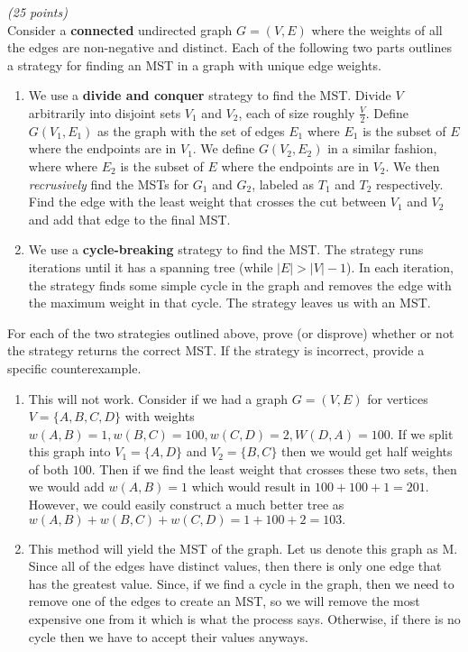 \documentclass{article}
\newcounter{ProblemCounter}
\newenvironment{problem}[1][Problem]{
 \begin{trivlist}
 \item[\hskip \labelsep {\bfseries #1}\hskip \labelsep {%
 \bfseries \theProblemCounter.%
 \stepcounter{ProblemCounter}%
 }]
}{
 \end{trivlist}
}
\begin{document}
\pagebreak
\begin{problem}\textit{(25 points)}\\
Consider a \textbf{connected} undirected graph $G=(V, E)$ where the weights of all the edges are non-negative and distinct. Each of the following two parts outlines a strategy for finding an MST in a graph with unique edge weights.

\begin{enumerate}
    \item We use a \textbf{divide and conquer} strategy to find the MST. Divide $V$ arbitrarily into disjoint sets $V_1$ and $V_2$, each of size roughly $\frac{V}{2}$. Define $G(V_1, E_1)$ as the graph with the set of edges $E_1$ where $E_1$ is the subset of $E$ where the endpoints are in $V_1$. We define $G(V_2, E_2)$ in a similar fashion, where where $E_2$ is the subset of $E$ where the endpoints are in $V_2$. We then \textit{recrusively} find the MSTs for $G_1$ and $G_2$, labeled as $T_1$ and $T_2$ respectively. Find the edge with the least weight that crosses the cut between $V_1$ and $V_2$ and add that edge to the final MST.
    
    \item We use a \textbf{cycle-breaking} strategy to find the MST. The strategy runs iterations until it has a spanning tree (while $|E| > |V| - 1$). In each iteration, the strategy finds some simple cycle in the graph and removes the edge with the maximum weight in that cycle. The strategy leaves us with an MST.
\end{enumerate}

\noindent
For each of the two strategies outlined above, prove (or disprove) whether or not the strategy returns the correct MST. If the strategy is incorrect, provide a specific counterexample. \\
\end{problem}

\begin{enumerate}
    \item 
    
    This will not work. Consider if we had a graph $G = (V, E)$ for vertices $V = \{A, B, C, D\}$ with weights $w(A, B) = 1, w(B, C) = 100, w(C, D) = 2, W(D, A) = 100.$ If we split this graph into $V_1 = \{A, D\}$ and $V_2 = \{B, C\}$ then we would get half weights of both $100$. Then if we find the least weight that crosses these two sets, then we would add $w(A, B) = 1$ which would result in $100 + 100 + 1 = 201.$ However, we could easily construct a much better tree as $w(A, B) + w(B, C) + w(C, D) = 1 + 100 + 2 = 103.$
    
    \item
    
    This method will yield the MST of the graph. Let us denote this graph as M. Since all of the edges have distinct values, then there is only one edge that has the greatest value. Since, if we find a cycle in the graph, then we need to remove one of the edges to create an MST, so we will remove the most expensive one from it which is what the process says. Otherwise, if there is no cycle then we have to accept their values anyways.
    
\end{enumerate}
\end{document}
